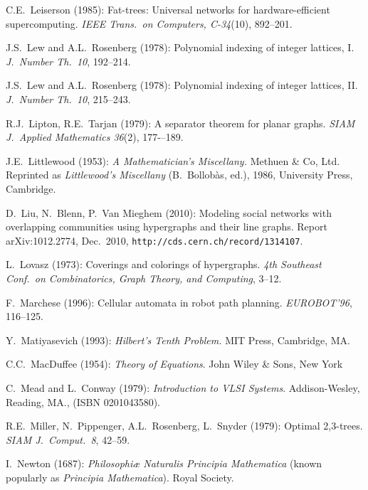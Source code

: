 \begin{thebibliography}{999}
C.E.~Leiserson (1985):
Fat-trees: Universal networks for hardware-efficient supercomputing.
{\it IEEE Trans.~on Computers, C-34}(10), 892--201.

J.S.~Lew and A.L.~Rosenberg (1978): Polynomial indexing of integer
lattices, I.  {\it J.~Number Th.~10}, 192--214.
 
J.S.~Lew and A.L.~Rosenberg (1978): Polynomial indexing of integer
lattices, II.  {\it J.~Number Th.~10}, 215--243.

R.J.~Lipton, R.E.~Tarjan (1979):
A separator theorem for planar graphs.
{\it SIAM J.~Applied Mathematics 36}(2), 177-–189.

J.E.~Littlewood (1953):
{\it A Mathematician's Miscellany.}
Methuen \& Co, Ltd.
Reprinted as {\it Littlewood's Miscellany} (B.~Bollob\`{a}s, ed.),
1986, University Press, Cambridge.

D.~Liu, N.~Blenn, P.~Van Mieghem (2010):
Modeling social networks with overlapping communities using
hypergraphs and their line graphs.
Report arXiv:1012.2774, Dec.~2010,
{\tt http://cds.cern.ch/record/1314107}.

L.~Lovasz (1973): Coverings and colorings of hypergraphs.  {\it 4th
  Southeast Conf.~on Combinatorics, Graph Theory, and Computing},
3--12.


F.~Marchese (1996): Cellular automata in robot path planning.
{\it EUROBOT'96}, 116--125.

Y.~Matiyasevich (1993):
{\it Hilbert's Tenth Problem.}
MIT Press, Cambridge, MA.

C.C.~MacDuffee (1954):
{\it Theory of Equations}.
John Wiley \& Sons, New York

C.~Mead and L.~Conway (1979):
{\it Introduction to VLSI Systems}.
Addison-Wesley, Reading, MA., (ISBN 0201043580).


R.E.~Miller, N.~Pippenger, A.L.~Rosenberg, L.~Snyder (1979): Optimal
2,3-trees.  {\it SIAM J.~Comput.~8}, 42--59.



I.~Newton (1687): {\it Philosophiæ Naturalis Principia Mathematica}
(known popularly as {\it Principia Mathematica}).
Royal Society.



\end{thebibliography}
